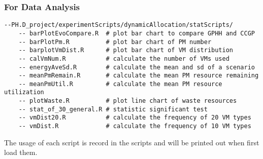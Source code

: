 \subsubsection{For Data Analysis}
\begin{lstlisting}
--PH.D_project/experimentScripts/dynamicAllocation/statScripts/
	-- barPlotEvoCompare.R  # plot bar chart to compare GPHH and CCGP
	-- barPlotPm.R          # plot bar chart of PM number
	-- barplotVmDist.R      # plot bar chart of VM distribution
	-- calVmNum.R           # calculate the number of VMs used
	-- energyAveSd.R        # calculate the mean and sd of a scenario
	-- meanPmRemain.R 		# calculate the mean PM resource remaining
	-- meanPmUtil.R   		# calculate the mean PM resource utilization
	-- plotWaste.R          # plot line chart of waste resources
	-- stat_of_30_general.R # statistic significant test
	-- vmDist20.R           # calculate the frequency of 20 VM types
	-- vmDist.R             # calculate the frequency of 10 VM types
\end{lstlisting}

The usage of each script is record in the scripts and will be printed out when first load them.
